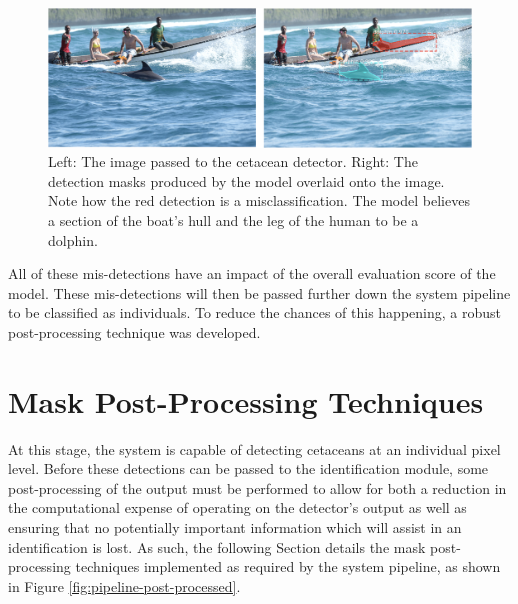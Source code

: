 \begin{figure}[h]
	\begin{center}
		\includegraphics[scale=0.6]{Chapter3/figs/model-fail-boat.png}
	\end{center}
	\caption[Left: The image passed to the cetacean detector. Right: The detection masks produced by the model overlaid onto the image.]{Left: The image passed to the cetacean detector. Right: The detection masks produced by the model overlaid onto the image. Note how the red detection is a misclassification. The model believes a section of the boat's hull and the leg of the human to be a dolphin.}
	\label{fig:model-fail-boat}
\end{figure}

All of these mis-detections have an impact of the overall evaluation score of the model. These mis-detections will then be passed further down the system pipeline to be classified as individuals. To reduce the chances of this happening, a robust post-processing technique was developed.

\section{Mask Post-Processing Techniques}\label{ch:cetDet,sec:postProcessing}

At this stage, the system is capable of detecting cetaceans at an individual pixel level. Before these detections can be passed to the identification module, some post-processing of the output must be performed to allow for both a reduction in the computational expense of operating on the detector's output as well as ensuring that no potentially important information which will assist in an identification is lost. As such, the following Section details the mask post-processing techniques implemented as required by the system pipeline, as shown in Figure \ref{fig:pipeline-post-processed}.

